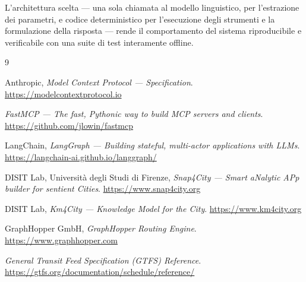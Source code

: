 \documentclass[a4paper,oneside]{Tptesi2}
\begin{document}
L'architettura scelta --- una sola chiamata al modello linguistico, per l'estrazione dei
parametri, e codice deterministico per l'esecuzione degli strumenti e la formulazione
della risposta --- rende il comportamento del sistema riproducibile e verificabile con
una suite di test interamente offline.

\begin{thebibliography}{9}

Anthropic, \emph{Model Context Protocol --- Specification}.
\url{https://modelcontextprotocol.io}

\emph{FastMCP --- The fast, Pythonic way to build MCP servers and clients}.
\url{https://github.com/jlowin/fastmcp}

LangChain, \emph{LangGraph --- Building stateful, multi-actor applications with LLMs}.
\url{https://langchain-ai.github.io/langgraph/}

DISIT Lab, Universit\`a degli Studi di Firenze, \emph{Snap4City --- Smart aNalytic
APp builder for sentient Cities}. \url{https://www.snap4city.org}

DISIT Lab, \emph{Km4City --- Knowledge Model for the City}.
\url{https://www.km4city.org}

GraphHopper GmbH, \emph{GraphHopper Routing Engine}.
\url{https://www.graphhopper.com}

\emph{General Transit Feed Specification (GTFS) Reference}.
\url{https://gtfs.org/documentation/schedule/reference/}

\end{thebibliography}
\end{document}
